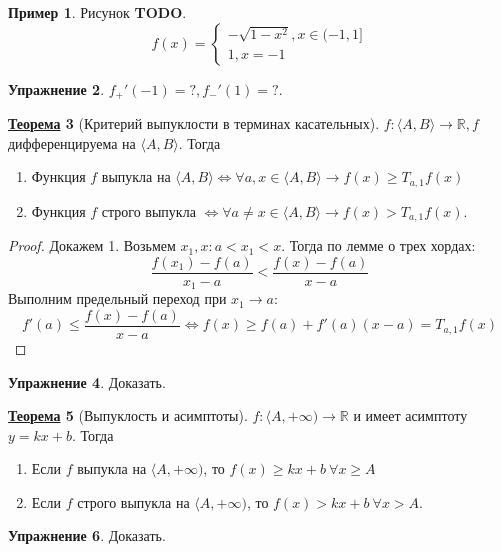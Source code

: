 \documentclass[12pt]{article}
\newenvironment{MyList}[1][4pt]{
  \begin{enumerate}[1.]
  \setlength{\parskip}{0pt}
  \setlength{\itemsep}{#1}
}{       
  \end{enumerate}
}
\def\TODO{{\color{red}\bf TODO}}
\def\R{\mathbb{R}}       %
\def\EQ{\Leftrightarrow} %
\theoremstyle{definition} %
\newtheorem{Thm}{\underline{Теорема}}[subsection] %
\newtheorem{Ex}[Thm]{Упражнение} %
\newtheorem{Example}[Thm]{Пример} %
\theoremstyle{plain} %
\theoremstyle{remark} %
\begin{document}
\begin{Example}
    Рисунок \TODO.
    \[f(x) = \begin{cases}
        -\sqrt{1 - x^2}, x \in (-1, 1] \\
        1, x = -1
    \end{cases}\]  
\end{Example}

\begin{Ex}
    $f_+'(-1) = ?, f_-'(1) = ?$.
\end{Ex}

\begin{Thm}[Критерий выпуклости в терминах касательных]
    $f : \langle A, B\rangle \to \R, f$ дифференцируема на $\langle A, B\rangle$. Тогда 
    \begin{MyList}
        \item Функция $f$ выпукла на $\langle A, B\rangle \EQ \forall a, x \in \langle A, B\rangle \to f(x) \geqslant T_{a, 1}f(x)$ 
        \item Функция $f$ строго выпукла $\EQ \forall a \neq x \in \langle A, B\rangle \to f(x) > T_{a, 1} f(x)$.
    \end{MyList}
\end{Thm}

\begin{proof}
    Докажем 1. Возьмем $x_1, x : a < x_1 < x$. Тогда по лемме о трех хордах:
    \[ \frac{f(x_1) - f(a)}{x_1 - a} < \frac{f(x) - f(a)}{x - a}\]
    Выполним предельный переход при $x_1 \to a$:
    \[f'(a) \leqslant \frac{f(x) - f(a)}{x - a} \EQ f(x) \geqslant f(a) + f'(a)(x - a) = T_{a, 1} f(x)\] 
\end{proof}

\begin{Ex}
    Доказать.
\end{Ex}

\begin{Thm}[Выпуклость и асимптоты]
    $f : \langle A, +\infty) \to \R$ и имеет асимптоту $y = kx + b$.
    Тогда
    \begin{MyList}
        \item Если $f$ выпукла на $\langle A, +\infty)$, то $f(x) \geqslant kx + b \ \forall x \geqslant A$
        \item Если $f$ строго выпукла на $\langle A, +\infty)$, то $f(x) > kx + b \ \forall x > A$.
    \end{MyList}
\end{Thm}

\begin{Ex}
    Доказать.
\end{Ex}
\end{document}
